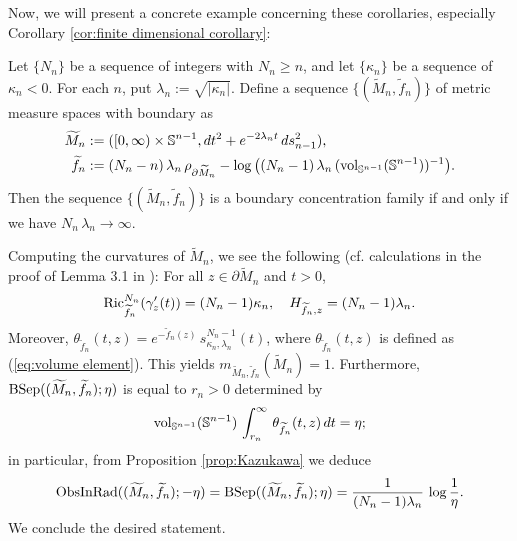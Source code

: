 Now,
we will present a concrete example concerning these corollaries, especially Corollary \ref{cor:finite dimensional corollary}:
\begin{ex}\label{ex:finite dimensional example}
Let $\{N_{n}\}$ be a sequence of integers with $N_{n} \geq n$,
and let $\{\kappa_{n}\}$ be a sequence of $\kappa_{n}<0$.
For each $n$,
put $\lambda_{n}:=\sqrt{\vert \kappa_{n} \vert}$.
Define a sequence $\{(\widetilde{M}_{n},\widetilde{f}_{n})\}$ of metric measure spaces with boundary as
\begin{align*}
\widetilde{M}_{n}&:=([0,\infty) \times \mathbb{S}^{n-1},dt^{2}+e^{-2\lambda_{n} t}\,ds_{n-1}^{2}),\\
\widetilde{f}_{n}&:=(N_{n}-n)\,\lambda_{n}\,\rho_{\partial \widetilde{M}_{n}}-\log\,\bigl( (N_{n}-1)\,\lambda_{n}\, (\operatorname{vol}_{\mathbb{S}^{n-1}} (\mathbb{S}^{n-1}))^{-1}\bigl).
\end{align*}
Then the sequence $\{(\widetilde{M}_{n},\widetilde{f}_{n})\}$ is a boundary concentration family if and only if we have $N_{n}\,\lambda_{n} \to \infty$.

Computing the curvatures of $\widetilde{M}_{n}$,
we see the following (cf. calculations in the proof of Lemma 3.1 in \cite{S1}):
For all $z\in \partial \widetilde{M}_{n}$ and $t>0$,
\begin{equation*}
\operatorname{Ric}^{N_{n}}_{\widetilde{f}_{n}}(\gamma'_{z}(t))=(N_{n}-1)\kappa_{n}, \quad H_{\widetilde{f}_{n},z}=(N_{n}-1)\lambda_{n}.
\end{equation*}
Moreover,
$\theta_{\widetilde{f}_{n}}(t,z)=e^{-\widetilde{f}_{n}(z)}\,s^{N_{n}-1}_{\kappa_{n},\lambda_{n}}(t)$,
where $\theta_{\widetilde{f}_{n}}(t,z)$ is defined as (\ref{eq:volume element}).
This yields $m_{\widetilde{M}_{n},\widetilde{f}_{n}}(\widetilde{M}_{n})=1$.
Furthermore,
$\operatorname{BSep}(  (\widetilde{M}_{n},\widetilde{f}_{n});\eta )$ is equal to $r_{n}>0$ determined by
\begin{equation*}
\operatorname{vol}_{\mathbb{S}^{n-1}} (\mathbb{S}^{n-1})\,\int^{\infty}_{r_{n}}\,\theta_{\widetilde{f}_{n}}(t,z)\,dt=\eta;
\end{equation*}
in particular,
from Proposition \ref{prop:Kazukawa}
we deduce
\begin{equation*}
\operatorname{ObsInRad}((\widetilde{M}_{n},\widetilde{f}_{n});-\eta)=\operatorname{BSep}(  (\widetilde{M}_{n},\widetilde{f}_{n});\eta )=\frac{1}{(N_{n}-1)\lambda_{n}}\,\log\frac{1}{\eta}.
\end{equation*}
We conclude the desired statement.
\end{ex}


